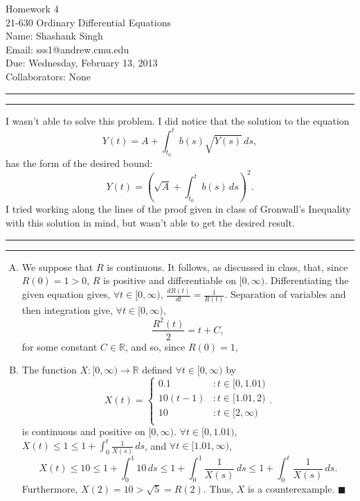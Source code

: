 \documentclass[11pt]{article}
\makeatletter
\newcounter{questionCounter}
\newcounter{partCounter}[questionCounter]
\newenvironment{question}[2][\arabic{questionCounter}]{%
    \setcounter{partCounter}{0}%
    \vspace{.25in} \hrule \vspace{0.5em}%
        \noindent{\bf #2}%
    \vspace{0.8em} \hrule \vspace{.10in}%
    \addtocounter{questionCounter}{1}%
}{}
\newcommand{\myname}{Shashank Singh}
\newcommand{\myandrew}{sss1@andrew.cmu.edu}
\newcommand{\myclass}{21-630 Ordinary Differential Equations}
\newcommand{\myhwnum}{4}
\newcommand{\duedate}{Wednesday, February 13, 2013}
\newcommand{\mycollaborators}{None}
\renewcommand{\qed}{\quad $\blacksquare$}
\newcommand{\R}{\mathbb{R}} %
\makeatother
\begin{document}
\thispagestyle{plain}

{\Large Homework \myhwnum} \\
\myclass \\
Name: \myname \\
Email: \myandrew \\
Due: \duedate \\
Collaborators: \mycollaborators

\begin{question}{Problem 1}
I wasn't able to solve this problem. I did notice that the solution to the
equation
\[Y(t) = A + \int_{t_0}^t b(s)\sqrt{Y(s)} \, ds,\]
has the form of the desired bound:
\[Y(t) = \left( \sqrt{A} + \int _{t_0}^t b(s) \, ds \right)^2.\]
I tried working along the lines of the proof given in class of Gronwall's
Inequality with this solution in mind, but wasn't able to get the desired
result.
\end{question}

\begin{question}{Problem 2}
\begin{enumerate}[A)]
\item We suppose that $R$ is continuous. It follows, as discussed in class,
that, since $R(0) = 1 > 0$, $R$ is positive and differentiable on $[0,\infty)$.
Differentiating the given equation gives, $\forall t \in [0,\infty)$,
$\frac{dR(t)}{dt} = \frac{1}{R(t)}$. Separation of variables and then
integration give, $\forall t \in [0,\infty)$,
\[
 \frac{R^2(t)}{2} = t + C,
\]
for some constant $C \in \R$, and so, since $R(0) = 1$,

\item The function $X: [0,\infty) \rightarrow \R$ defined
$\forall t \in [0,\infty)$ by
\[X(t) =
    \left\{
        \begin{array}{cl}
            0.1         & : t \in [0,1.01)      \\
            10(t - 1)   & : t \in [1.01,2)      \\
            10          & : t \in [2,\infty)    \\
        \end{array}
    \right..
\]
is continuous and positive on $[0,\infty)$.
$\forall t \in [0,1.01)$, $X(t) \leq 1 \leq 1 + \int_0^t \frac{1}{X(s)} \, ds$,
and $\forall t \in [1.01,\infty)$,
\[
  X(t)
  \leq 10
  \leq 1 + \int_0^1 10 \, ds
  \leq 1 + \int_0^1 \frac{1}{X(s)} \, ds
  \leq 1 + \int_0^t \frac{1}{X(s)} \, ds.
\]
Furthermore, $X(2) = 10 > \sqrt{5} = R(2)$. Thus, $X$ is a counterexample. \qed

\end{enumerate}
\end{question}
\end{document}
